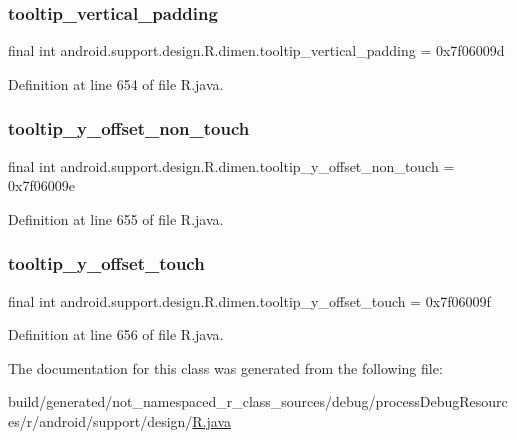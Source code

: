 \subsubsection{\texorpdfstring{tooltip\_vertical\_padding}{tooltip\_vertical\_padding}}
{\footnotesize\ttfamily final int android.\+support.\+design.\+R.\+dimen.\+tooltip\+\_\+vertical\+\_\+padding = 0x7f06009d\hspace{0.3cm}{\ttfamily [static]}}



Definition at line 654 of file R.\+java.

\mbox{\label{classandroid_1_1support_1_1design_1_1_r_1_1dimen_a4240fd5708c2da5d2eb045a23cf0b2a7}} 
\subsubsection{\texorpdfstring{tooltip\_y\_offset\_non\_touch}{tooltip\_y\_offset\_non\_touch}}
{\footnotesize\ttfamily final int android.\+support.\+design.\+R.\+dimen.\+tooltip\+\_\+y\+\_\+offset\+\_\+non\+\_\+touch = 0x7f06009e\hspace{0.3cm}{\ttfamily [static]}}



Definition at line 655 of file R.\+java.

\mbox{\label{classandroid_1_1support_1_1design_1_1_r_1_1dimen_a7e9207470a7236ed6fade4180fc9eeab}} 
\subsubsection{\texorpdfstring{tooltip\_y\_offset\_touch}{tooltip\_y\_offset\_touch}}
{\footnotesize\ttfamily final int android.\+support.\+design.\+R.\+dimen.\+tooltip\+\_\+y\+\_\+offset\+\_\+touch = 0x7f06009f\hspace{0.3cm}{\ttfamily [static]}}



Definition at line 656 of file R.\+java.



The documentation for this class was generated from the following file\+:\begin{DoxyCompactItemize}
\item 
build/generated/not\+\_\+namespaced\+\_\+r\+\_\+class\+\_\+sources/debug/process\+Debug\+Resources/r/android/support/design/\mbox{\hyperlink{android_2support_2design_2_r_8java}{R.\+java}}\end{DoxyCompactItemize}
